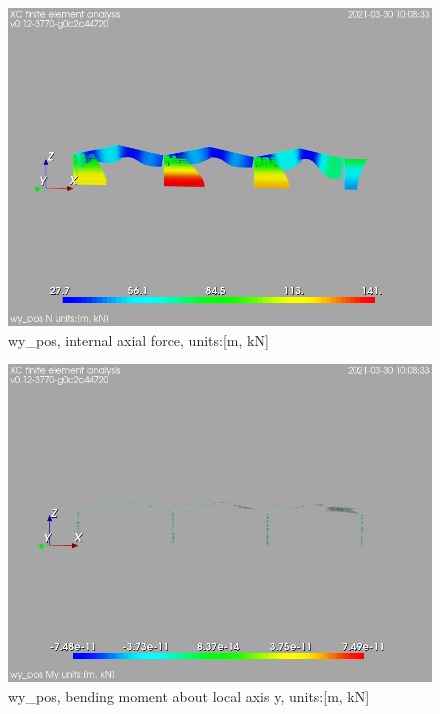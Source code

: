 \begin{figure}
\begin{center}
\includegraphics[width=\linewidth]{calc_results/sole_zeinali/text/graphics/resSimplLC/wy_posallMemberSetN}
\caption{wy_pos, internal axial force, units:[m, kN]}
\end{center}
\end{figure}
\begin{figure}
\begin{center}
\includegraphics[width=\linewidth]{calc_results/sole_zeinali/text/graphics/resSimplLC/wy_posallMemberSetMy}
\caption{wy_pos, bending moment about local axis y, units:[m, kN]}
\end{center}
\end{figure}
